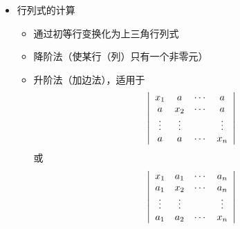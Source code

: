 \begin{frame}
  \begin{footnotesize}
    \begin{itemize}
    \item 行列式的计算
      \begin{itemize}
      \item 通过初等行变换化为上三角行列式
      \item 降阶法（使某行（列）只有一个非零元）
      \item 升阶法（加边法），适用于
        $$
    \left|
    \begin{array}{cccc}
      x_1 &  a  & \cdots & a   \\
      a   & x_2 & \cdots & a   \\
      \vdots & \vdots &     & \vdots \\
      a   &  a  & \cdots & x_n
    \end{array}
    \right|
    $$
    或
    $$
    \left|
    \begin{array}{cccc}
      x_1 & a_1  & \cdots & a_n   \\
      a_1 & x_2 & \cdots  & a_n   \\
      \vdots & \vdots &     & \vdots \\
      a_1 & a_2  & \cdots & x_n
    \end{array}
    \right|
    $$
      \end{itemize}
    \end{itemize}
  \end{footnotesize}
\end{frame}


